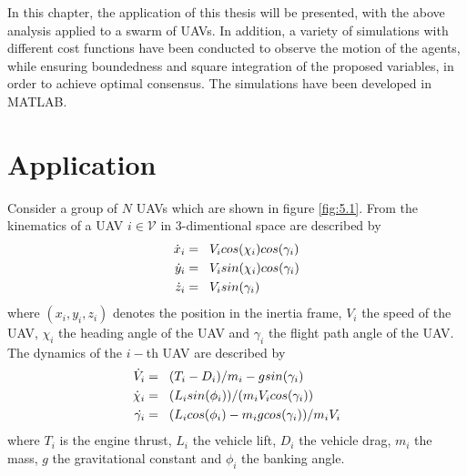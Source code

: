 In this chapter, the application of this thesis will be presented, with the above analysis applied to a swarm of UAVs. In addition, a variety of  simulations with different cost functions have been conducted to observe the motion of the agents, while ensuring boundedness and square integration of the proposed variables, in order to achieve optimal consensus. The simulations have been developed in MATLAB.

\section{Application}
    
    Consider a group of $N$ UAVs which are shown in figure \ref{fig:5.1}. From \cite{9213862} the kinematics of a UAV $i \in \mathcal{V}$  in 3-dimentional space are described by
    \begin{equation}\label{eq:5.1.1}
        \begin{align*}
            \dot{x}_i &= \hspace{2.0mm} V_i cos(\chi_i) cos(\gamma_i)\\
            \dot{y}_i &= \hspace{2.0mm} V_i sin(\chi_i) cos(\gamma_i)\\
            \dot{z}_i &= \hspace{2.0mm} V_i sin(\gamma_i)
        \end{align*}
    \end{equation}
    where $(x_i, y_i, z_i)$ denotes the position in the inertia frame, $V_i$ the speed of the UAV, $\chi_i$ the heading angle of the UAV and $\gamma_i$ the flight path angle of the UAV. The dynamics of the $i-$th UAV are described by
    \begin{equation}\label{eq:5.1.2}
        \begin{align*}
                \dot{V}_i &= \hspace{2.0mm}(T_i - D_i)/m_i - g sin(\gamma_i)\\
                \dot{\chi}_i &= \hspace{2.0mm}(L_i sin(\phi_i))/(m_i V_i cos(\gamma_i))\\
                \dot{\gamma_i} &= \hspace{2.0mm}(L_i cos(\phi_i) - m_i g cos(\gamma_i))/m_i V_i
        \end{align*}
    \end{equation}
    where $T_i$ is the engine thrust, $L_i$ the vehicle lift, $D_i$ the vehicle drag, $m_i$ the mass, $g$ the gravitational constant and $\phi_i$ the banking angle.
